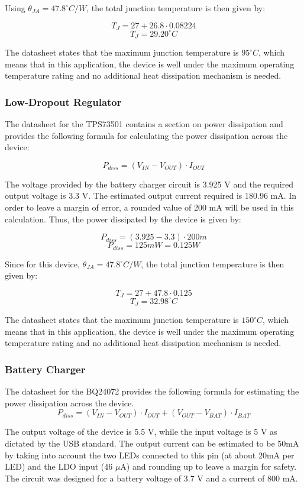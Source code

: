 Using $\theta_{JA} = 47.8^\circ C/W$, the total junction temperature is then given by:

\[T_J = 27 + 26.8 \cdot 0.08224 \]
\[\boxed{T_J = 29.20 ^\circ C}\]

The datasheet states that the maximum junction temperature is $95^\circ C$, which means that in this application, the device is well under the maximum operating temperature rating and no additional heat dissipation mechanism is needed.


\subsubsection{Low-Dropout Regulator}
The datasheet for the TPS73501 contains a section on power dissipation and provides the following formula for calculating the power dissipation across the device:

\[P_{diss} = \left(V_{IN} - V_{OUT}\right)\cdot I_{OUT}\]

The voltage provided by the battery charger circuit is 3.925 V and the required output voltage is 3.3 V.  The estimated output current required is 180.96 mA.  In order to leave a margin of error, a rounded value of 200 mA will be used in this calculation.  Thus, the power dissipated by the device is given by:

\[P_{diss} = \left(3.925 - 3.3\right)\cdot 200m\]
\[\boxed{P_{diss} = 125mW = 0.125W}\]

Since for this device, $\theta_{JA} = 47.8^\circ C/W$, the total junction temperature is then given by:

\[T_J = 27 + 47.8 \cdot 0.125 \]
\[\boxed{T_J = 32.98 ^\circ C}\]

The datasheet states that the maximum junction temperature is $150^\circ C$, which means that in this application, the device is well under the maximum operating temperature rating and no additional heat dissipation mechanism is needed.


\subsubsection{Battery Charger}

The datasheet for the BQ24072 provides the following formula for estimating the power dissipation across the device.
\[P_{diss} = \left(V_{IN} - V_{OUT}\right)\cdot I_{OUT} + \left(V_{OUT} - V_{BAT}\right)\cdot I_{BAT}\]

The output voltage of the device is 5.5 V, while the input voltage is 5 V as dictated by the USB standard.  The output current can be estimated to be 50mA by taking into account the two LEDs connected to this pin (at about 20mA per LED) and the LDO input (46 $\mu$A) and rounding up to leave a margin for safety.  The circuit was designed for a battery voltage of 3.7 V and a current of 800 mA.

